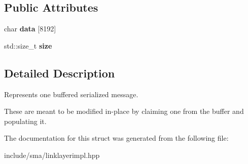 \subsection*{Public Attributes}
\begin{DoxyCompactItemize}
\item 
\hypertarget{structsma_1_1detail_1_1MessageData_abec85f24802bce558f1da8b8175d4762}{char {\bfseries data} \mbox{[}8192\mbox{]}}\label{structsma_1_1detail_1_1MessageData_abec85f24802bce558f1da8b8175d4762}

\item 
\hypertarget{structsma_1_1detail_1_1MessageData_a09a8c912128079d92de8e0d587c448e5}{std\-::size\-\_\-t {\bfseries size}}\label{structsma_1_1detail_1_1MessageData_a09a8c912128079d92de8e0d587c448e5}

\end{DoxyCompactItemize}


\subsection{Detailed Description}
Represents one buffered serialized message. 

These are meant to be modified in-\/place by claiming one from the buffer and populating it. 

The documentation for this struct was generated from the following file\-:\begin{DoxyCompactItemize}
\item 
include/sma/linklayerimpl.\-hpp\end{DoxyCompactItemize}

